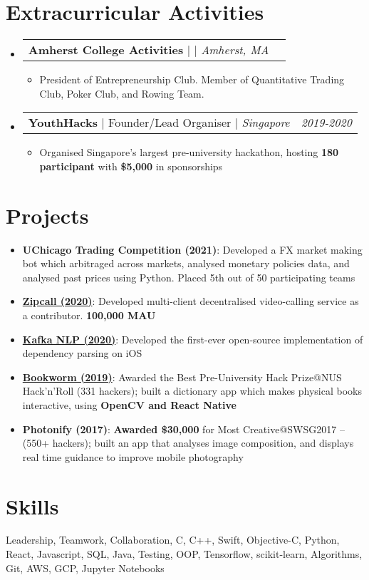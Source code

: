 \documentclass[letterpaper,11pt]{article}
\makeatletter
\newcommand{\resumeItem}[1]{
  \item\small{ #1 \vspace{-3pt}}
}
\newcommand{\resumeSubheading}[4]{
  \vspace{0pt}\item[]
    \begin{tabular*}{0.97\textwidth}[t]{l@{\extracolsep{\fill}}r}
      \textbf{#1} | #3 | \textit{\small#2} & \textit{\small #4} \\
    \end{tabular*}\vspace{-8pt}
}
\newcommand{\resumeSubItem}[1]{\resumeItem{#1}\vspace{-4pt}}
\newcommand{\resumeSubHeadingListStart}{\begin{itemize}[leftmargin=0mm]}
\newcommand{\resumeSubHeadingListEnd}{\end{itemize}\vspace{-8pt}}
\newcommand{\resumeItemListStart}{\begin{itemize}}
\newcommand{\resumeItemListEnd}{\end{itemize}\vspace{-8pt}}
\makeatother
\begin{document}
\section{Extracurricular Activities}
  \resumeSubHeadingListStart
    \resumeSubheading
    {Amherst College Activities}
    {Amherst, MA}{}{}
   \resumeItemListStart
        \resumeItem {President of Entrepreneurship Club. Member of Quantitative Trading Club, Poker Club, and Rowing Team.}
      \resumeItemListEnd
      \resumeSubheading{YouthHacks}{Singapore}{Founder/Lead Organiser}{2019-2020}
      \resumeItemListStart
      \resumeItem {Organised Singapore's largest pre-university hackathon, hosting  \textbf{180 participant} with  \textbf{\$5,000} in sponsorships}
      \resumeItemListEnd
  \resumeSubHeadingListEnd 



\section{Projects}
  \resumeItemListStart
    \resumeSubItem{{\textbf{UChicago Trading Competition (2021)}}: Developed a FX market making bot which arbitraged across markets, analysed monetary policies data, and analysed past prices using Python. Placed 5th out of 50 participating teams}
    \resumeSubItem{\href{https://github.com/questo-ai/decentralized-video-chat/}{\textbf{Zipcall (2020)}}: Developed multi-client decentralised video-calling service as a contributor. \textbf{100,000 MAU}}
  \resumeSubItem{\href{https://github.com/questo-ai/Kafka/}{\textbf{Kafka NLP (2020)}}: Developed the first-ever open-source implementation of dependency parsing on iOS}
  \resumeSubItem{\href{https://devpost.com/software/bookworm-aye8z5}{\textbf{Bookworm (2019)}}: Awarded the Best Pre-University Hack Prize@NUS Hack'n'Roll (331 hackers); built a dictionary app which makes physical books interactive, using \textbf{OpenCV and React Native}}
  \resumeSubItem{\textbf{Photonify (2017)}: \textbf{Awarded \$30,000} for Most Creative@SWSG2017 – (550+ hackers); built an app that analyses image composition, and displays real time guidance to improve mobile photography}
  \resumeItemListEnd 
  
 \section{Skills}\small{ Leadership, Teamwork, Collaboration, C, C++, Swift, Objective-C, Python, React, Javascript, SQL, Java, Testing, OOP, Tensorflow, scikit-learn, Algorithms, Git, AWS, GCP, Jupyter Notebooks }

\end{document}

